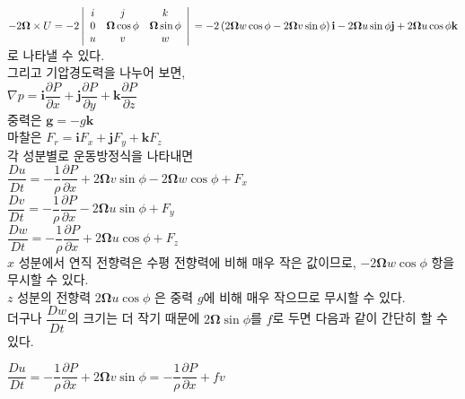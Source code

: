$ -2 \mathbf {\Omega} \times U  
= -2 \left| \begin{array}{ccc}
i & j & k \\
0 & \mathbf {\Omega} \cos \phi & \mathbf {\Omega} \sin \phi \\
u & v & w \end{array} \right| \\

= -2 \left( 2 \mathbf {\Omega} w \cos \phi -2 \mathbf {\Omega} v \sin \phi \right) \mathbf{i}
- 2 \mathbf {\Omega} u \sin \phi \mathbf{j}
+ 2 \mathbf {\Omega} u \cos \phi \mathbf{k}$\\
로 나타낼 수 있다. \\

그리고 기압경도력을 나누어 보면, \\

$ \nabla p = \mathbf{i} \dfrac{\partial P}{\partial x} 
+ \mathbf{j} \dfrac{\partial P}{\partial y}
+ \mathbf{k} \dfrac{\partial P}{\partial z}$\\

중력은 
$ \mathbf{g} = -g \mathbf{k} $\\

마찰은 
$ F_{r} = \mathbf{i} F_{x}
+ \mathbf{j} F_{y}
+ \mathbf{k} F_{z}$\\

각 성분별로 운동방정식을 나타내면 \\

$ \dfrac{Du}{Dt}
= - \dfrac{1}{\rho} \dfrac{\partial P}{\partial x} 
+ 2 \mathbf {\Omega} v \sin \phi - 2 \mathbf {\Omega} w \cos \phi 
+ F_{x} $\\

$ \dfrac{Dv}{Dt}
= - \dfrac{1}{\rho} \dfrac{\partial P}{\partial x} 
- 2 \mathbf {\Omega} u \sin \phi
+ F_{y} $\\

$ \dfrac{Dw}{Dt}
= - \dfrac{1}{\rho} \dfrac{\partial P}{\partial x} 
+ 2 \mathbf {\Omega} u \cos \phi 
+ F_{z}$\\

$x$ 성분에서 연직 전향력은 수평 전향력에 비해 매우 작은 값이므로, $- 2 \mathbf {\Omega} w \cos \phi $ 항을 무시할 수 있다. \\
$z$ 성분의 전향력 $ 2 \mathbf {\Omega} u \cos \phi $ 은 중력 $g$에 비해 매우 작으므로 무시할 수 있다. \\
더구나 $ \dfrac{Dw}{Dt}$의 크기는 더 작기 때문에 $ 2 \mathbf {\Omega} \sin \phi $를 $f$로 두면 다음과 같이 간단히 할 수 있다.

$ \dfrac{Du}{Dt}
= - \dfrac{1}{\rho} \dfrac{\partial P}{\partial x} 
+ 2 \mathbf {\Omega} v \sin \phi 
= - \dfrac{1}{\rho} \dfrac{\partial P}{\partial x} 
+ f v $\\

